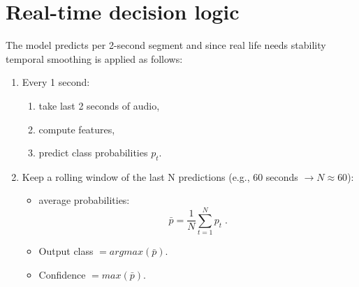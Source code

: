 \documentclass[12pt]{report}
\begin{document}
\section{Real-time decision logic}

The model predicts per 2-second segment and since real life needs stability temporal smoothing is applied as follows:
\begin{enumerate}
	\item Every 1 second:
	\begin{enumerate}[label=\roman*.]
		\item take last 2 seconds of audio,
		\item compute features,
		\item predict class probabilities $p_t$.
	\end{enumerate}
	\item Keep a rolling window of the last N predictions (e.g., 60 seconds $\to N\approx 60$):
	\begin{itemize}[label=]
		\item average probabilities:
		\begin{equation}\label{av-prob}
			\bar{p} = \frac{1}{N}\sum_{t=1}^{N} p_t \; .
		\end{equation}
		\item Output class $= argmax(\bar{p})$.
		\item Confidence $= max(\bar{p})$.
	\end{itemize}
\end{enumerate}
\pagebreak
{}
\printbibliography
\thispagestyle{empty}
\end{document}
